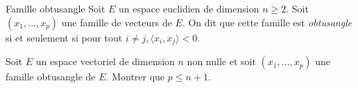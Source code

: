 \begin{defi}{Famille obtusangle}
    Soit $E$ un espace euclidien de dimension $n \geqslant 2$. Soit $(x_1, \dots, x_p)$ une famille de vecteurs de $E$. On dit que cette famille est \emph{obtusangle} si et seulement si pour tout $i \not= j, \langle x_i, x_j \rangle < 0$. 
\end{defi}

\begin{exercice}
    Soit $E$ un espace vectoriel de dimension $n$ non nulle et soit $(x_1, \dots, x_p)$ une famille obtusangle de $E$. Montrer que $p \leqslant n + 1$. 
\end{exercice}

\begin{solution}
\end{solution}
